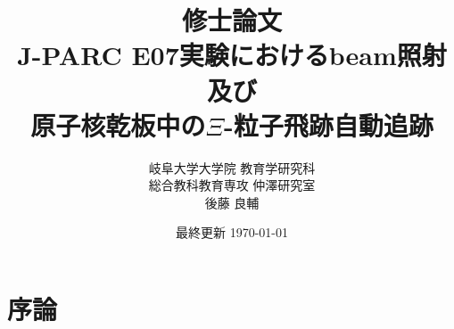 \documentclass[12pt,a4paper]{jarticle}
\begin{document}
\begin{titlepage}
\title{\vspace{60mm} \LARGE 修士論文\vspace{10mm}\\J-PARC E07実験におけるbeam照射及び\\原子核乾板中の$\Xi$-粒子飛跡自動追跡}
\author{\Large 岐阜大学大学院 教育学研究科 \\ \vspace{5mm}
\Large 総合教科教育専攻 仲澤研究室 \\ \vspace{5mm}
\LARGE 後藤 良輔}
\date{最終更新 \today}
\maketitle
\thispagestyle{empty} %
\end{titlepage}

\thispagestyle{empty} %
\tableofcontents
\thispagestyle{empty} %
\newpage
\section{序論}
\end{document}

